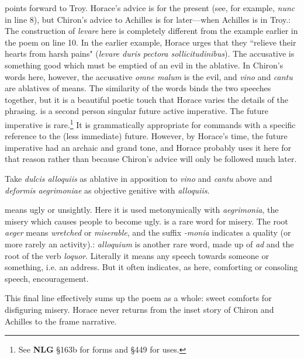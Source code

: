 
 points forward to Troy.  Horace's advice is for the present (see, for example, \textit{nunc} in line 8), but Chiron's advice to Achilles is for later---when Achilles is in Troy.: The construction of \textit{levare} here is completely different from the example earlier in the poem on line 10.  In the earlier example, Horace urges that they ``relieve their hearts from harsh pains" (\textit{levare duris pectora sollicitudinibus}). The accusative is something good which must be emptied of an evil in the ablative.  In Chiron's words here, however, the accusative \textit{omne malum} is the evil, and \textit{vino} and \textit{cantu} are ablatives of means.  The similarity of the words binds the two speeches together, but it is a beautiful poetic touch that Horace varies the details of the phrasing.\indent{} is a second person singular future active imperative.  The future imperative is rare.\footnote{See \textbf{NLG} \S 163b for forms and \S 449 for uses.}  It is grammatically appropriate for commands with a specific reference to the (less immediate) future.  However, by Horace's time, the future imperative had an archaic and grand tone, and Horace probably uses it here for that reason rather than because Chiron's advice will only be followed much later.


Take \textit{dulcis alloquiis} as ablative in apposition to \textit{vino} and \textit{cantu} above and \textit{deformis aegrimoniae} as objective genitive with \textit{alloquiis}.


 means ugly or unsightly.  Here it is used metonymically with \textit{aegrimonia}, the misery which causes people to become ugly.\indent{} is a rare word for misery.  The root \textit{aeger} means \textit{wretched} or \textit{miserable}, and the suffix \textit{-monia} indicates a quality (or more rarely an activity).\indent{}: \textit{alloquium} is another rare word, made up of \textit{ad} and the root of the verb \textit{loquor}.  Literally it means any speech towards someone or something, i.e. an address.  But it often indicates, as here, comforting or consoling speech, encouragement.

This final line effectively sums up the poem as a whole: sweet comforts for disfiguring misery.  Horace never returns from the inset story of Chiron and Achilles to the frame narrative.

